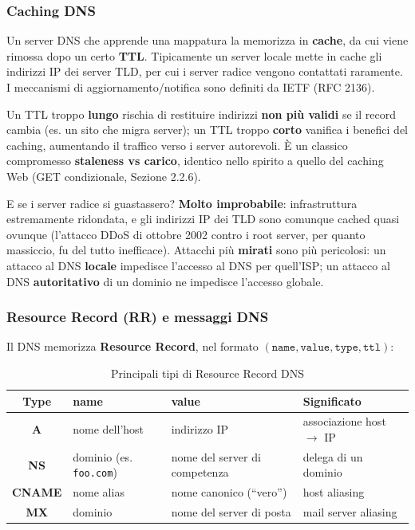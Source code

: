 \documentclass[12pt, a4paper]{article}
\begin{document}
\subsubsection{Caching DNS}

Un server DNS che apprende una mappatura la memorizza in \textbf{cache}, da cui viene rimossa dopo un certo \textbf{TTL}. Tipicamente un server locale mette in cache gli indirizzi IP dei server TLD, per cui i server radice vengono contattati raramente. I meccanismi di aggiornamento/notifica sono definiti da IETF (RFC 2136).

\begin{tcolorbox}[colback=cyan!5, colframe=blue!40!black, title=\textbf{Spunto per l'orale -- problemi del caching DNS}]
Un TTL troppo \textbf{lungo} rischia di restituire indirizzi \textbf{non più validi} se il record cambia (es. un sito che migra server); un TTL troppo \textbf{corto} vanifica i benefici del caching, aumentando il traffico verso i server autorevoli. È un classico compromesso \textbf{staleness vs carico}, identico nello spirito a quello del caching Web (GET condizionale, Sezione 2.2.6).
\end{tcolorbox}

E se i server radice si guastassero? \textbf{Molto improbabile}: infrastruttura estremamente ridondata, e gli indirizzi IP dei TLD sono comunque cached quasi ovunque (l'attacco DDoS di ottobre 2002 contro i root server, per quanto massiccio, fu del tutto inefficace). Attacchi più \textbf{mirati} sono più pericolosi: un attacco al DNS \textbf{locale} impedisce l'accesso al DNS per quell'ISP; un attacco al DNS \textbf{autoritativo} di un dominio ne impedisce l'accesso globale.

\subsubsection{Resource Record (RR) e messaggi DNS}

Il DNS memorizza \textbf{Resource Record}, nel formato $(\texttt{name}, \texttt{value}, \texttt{type}, \texttt{ttl})$:

\begin{table}[H]
\centering
\caption{Principali tipi di Resource Record DNS}
\begin{tabular}{clll}
\toprule
\textbf{Type} & \textbf{name} & \textbf{value} & \textbf{Significato} \\
\midrule
\textbf{A} & nome dell'host & indirizzo IP & associazione host $\to$ IP \\
\textbf{NS} & dominio (es. \texttt{foo.com}) & nome del server di competenza & delega di un dominio \\
\textbf{CNAME} & nome alias & nome canonico (``vero'') & host aliasing \\
\textbf{MX} & dominio & nome del server di posta & mail server aliasing \\
\bottomrule
\end{tabular}
\end{table}
\end{document}
